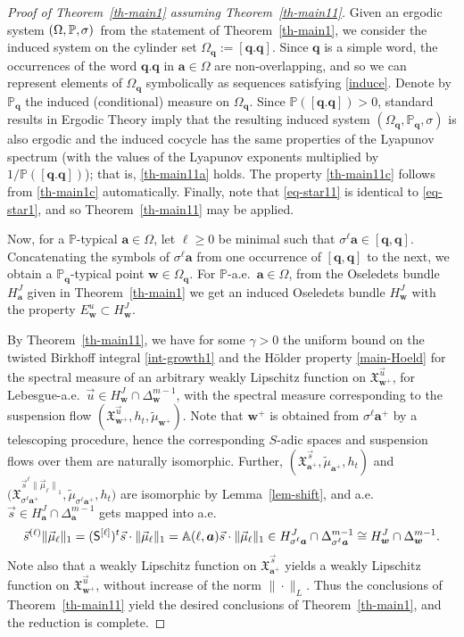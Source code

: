 \documentclass[JEP,XML,SOM,Unicode]{cedram}
\theoremstyle{plain}
\theoremstyle{definition}
\let\wt\widetilde
\newcommand\bom{{\boldsymbol a}}\let\ba\bom
\newcommand\bq{{\boldsymbol q}}
\newcommand\bw{{\boldsymbol w}}
\newcommand\bqcyl{[\bq.\bq]}
\let\gam\gamma
\let\Om\Omega
\let\sig\sigma
\newcommand\Xx{\mathfrak{X}}
\newcommand\Aa{\mathbb{A}}
\renewcommand{\P}{\mathbb{P}}
\newcommand\Sf{{\sf S}}
\begin{document}
\begin{proof}[Proof of Theorem~\ref{th-main1} assuming Theorem~\ref{th-main11}] Given an ergodic system $(\Om,\P,\mkern-1mu\sig)$~from the statement of Theorem~\ref{th-main1}, we consider the induced system on the cylinder set
$\Om_\bq:= [\bq.\bq]$.
Since $\bq$ is a simple word, the occurrences of the word $\bq.\bq$ in $\bom\in \Om$ are non-overlapping, and so
we can represent elements of $\Om_\bq$ symbolically as sequences satisfying \eqref{induce}. Denote by $\P_{\!\!\bq}$ the induced (conditional) measure on $\Om_\bq$. Since $\P([\bq.\bq])>0$, standard results in Ergodic Theory imply that the resulting induced system $(\Om_\bq,\P_{\!\!\bq},\sig)$ is also ergodic and the induced cocycle has the same properties of the Lyapunov spectrum (with the values of the Lyapunov exponents multiplied by $1/\P(\bqcyl)$); that is, \eqref{th-main11a} holds. The property \eqref{th-main11c} follows from \eqref{th-main1c} automatically. Finally, note that \eqref{eq-star11} is identical to \eqref{eq-star1}, and
so Theorem~\ref{th-main11} may be applied.

Now, for a $\P$-typical $\ba\in \Om$, let $\ell\ge 0$ be minimal such that $\sig^\ell\ba \in [\bq,\bq]$. Concatenating the symbols of $\sig^\ell\ba$ from one occurrence of $[\bq,\bq]$ to the next, we
obtain a $\P_{\!\!\bq}$-typical point $\bw\in \Om_\bq$.
For $\P$-a.e.\ $\ba\in \Om$, from the Oseledets bundle $H_\ba^J$ given in Theorem~\ref{th-main1} we get an induced Oseledets bundle $H_\bw^J$ with the property $E^u_\bw \subset H_\bw^J$.

By
Theorem~\ref{th-main11}, we have for some $\gam>0$ the uniform bound on the twisted Birkhoff integral \eqref{int-growth1} and the Hölder property \eqref{main-Hoeld}
for the spectral measure of an arbitrary
weakly Lipschitz function on $\Xx_{\bw^+}^{\vec u}$, for Lebesgue-a.e.\ $\vec u\in H_\bw^J\cap \Delta_\bw^{m-1}$, with the spectral measure corresponding to the suspension flow
$(\Xx_{\bw^+}^{\vec u}, h_t,\wt\mu_{\bw^+})$. Note that $\bw^+$ is obtained from $\sig^\ell\ba^+$ by a telescoping procedure, hence the corresponding $S$-adic spaces and suspension flows over them are naturally isomorphic. Further, $(\Xx_{\ba^+}^{\vec{s}},\wt{\mu}_{\bom^+},h_t)$ and $\bigl(\Xx_{\sig^\ell\ba^+}^{\vec{s}^{\ell}{\|\vec \mu_\ell\|}_1},\wt{\mu}_{\sig^\ell\bom^+},h_t\bigr)$ are isomorphic
by Lemma~\ref{lem-shift}, and a.e.\ $\vec s\in H^J_\ba\cap \Delta_\ba^{m-1}$ gets mapped into a.e.
\[
\vec s^{(\ell)}\|\vec\mu_\ell\|_1 = (\Sf^{[\ell]})^t \vec s \cdot\|\vec\mu_\ell\|_1 = \Aa(\ell,\ba)\vec s\cdot \|\vec\mu_\ell\|_1\in H_{\sig^\ell\ba}^J\cap \Delta^{m-1}_{\sig^\ell\ba}\cong H_\bw^J\cap \Delta_\bw^{m-1}.
\]
Note also that a weakly Lipschitz function on $\Xx_{\ba^+}^{\vec{s}}$ yields a weakly Lipschitz function on $\Xx_{\bw^+}^{\vec u}$, without increase of the norm $\|\cdot\|_L$. Thus the conclusions of Theorem~\ref{th-main11} yield the desired conclusions of Theorem~\ref{th-main1}, and the
reduction is complete.
\end{proof}
\end{document}
